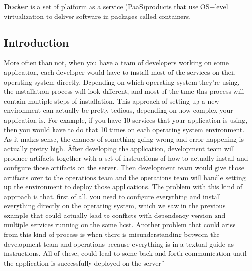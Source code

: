 \bd[Docker]
\textbf{Docker} is a set of platform as a service (PaaS)\footnotemark products that use OS$-$level virtualization to
deliver software in packages called containers.
\ed


\subsection{Introduction}

More often than not, when you have a team of developers working on some application, each developer would have to
install most of the services on their operating system directly. Depending on which operating system they're using,
the installation process will look different, and most of the time this process will contain multiple steps of
installation. This approach of setting up a new environment can actually be pretty tedious, depending on how complex
your application is. For example, if you have 10 services that your application is using, then you would have to do
that 10 times on each operating system environment. As it makes sense, the chances of something going wrong and error
happening is actually pretty high. \v

After developing the application, development team will produce artifacts together with a set of instructions of how
to actually install and configure those artifacts on the server. Then development team would give those artifacts
over to the operations team and the operations team will handle setting up the environment to deploy those
applications. The problem with this kind of approach is that, first of all, you need to configure everything and
install everything directly on the operating system, which we saw in the previous example that could actually lead to
conflicts with dependency version and multiple services running on the same host. Another problem that could arise
from this kind of process is when there is misunderstanding between the development team and operations because
everything is in a textual guide as instructions. All of these, could lead to some back and forth communication until
the application is successfully deployed on the server. \v

